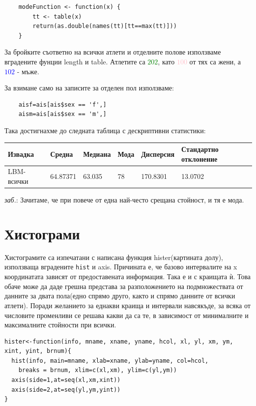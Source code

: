 \documentclass[12pt]{article}
\begin{document}
\begin{large}
\begin{verbatim}
	modeFunction <- function(x) {
		tt <- table(x)
		return(as.double(names(tt)[tt==max(tt)]))
	}
\end{verbatim}

За бройките съответно на всички атлети и отделните полове използваме вградените фунции length и table. Атлетите са \textcolor{green}{$202$}, като \textcolor{pink}{$100$} от тях са жени, а \textcolor{blue}{$102$} - мъже.

За взимане само на записите за отделен пол използваме:
\begin{verbatim}
	aisf=ais[ais$sex == 'f',]
	aism=ais[ais$sex == 'm',]
\end{verbatim}
Така достигнахме до следната таблица с дескриптивни статистики:

\begin{tabular}{ |p{2.4cm}|p{2.4cm}|p{2.4cm}|p{2cm}|p{2.4cm}|p{2.4cm}|  }
 \hline 
 Извадка & Средна & Медиана & Мода & Дисперсия & Стандартно отклонение\\
 \hline \hline
 LBM-всички & 64.87371 & 63.035 & 78 & 170.8301 & 13.0702 \\
 \hline
\end{tabular}



\textit{заб.}: Зачитаме, че при повече от една най-често срещана стойност, и тя е мода.

\section{Хистограми}
Хистограмите са изпечатани с написана функция hister(картината долу), използваща вградените \texttt{hist} и axis. Причината е, че базово интервалите на x координатата зависят от предоставената информация. Така е и с краищата ѝ. Това обаче може да даде грешна представа за разположението на подмножествата от данните за двата пола(едно спрямо друго, както и спрямо данните от всички атлети). Поради желанието за еднакви краища и интервали навсякъде, за всяка от числовите променливи се решава какви да са те, в зависимост от минималните и максималните стойности при всички. 

\begin{verbatim}
hister<-function(info, mname, xname, yname, hcol, xl, yl, xm, ym, xint, yint, brnum){
  hist(info, main=mname, xlab=xname, ylab=yname, col=hcol,
   	breaks = brnum, xlim=c(xl,xm), ylim=c(yl,ym))
  axis(side=1,at=seq(xl,xm,xint))
  axis(side=2,at=seq(yl,ym,yint))
}
\end{verbatim}


\end{large}
\end{document}
